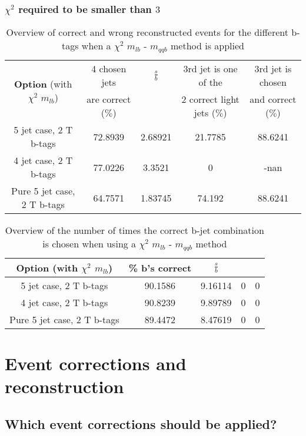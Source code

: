 \documentclass[a4paper,12pt]{report}
\begin{document}
 \subsection{$\chi^{2}$ required to be smaller than $3$}
 \begin{table}[!h] 
 \begin{tabular}{c|c|c|c|c} 
\multirow{2}{*}{\textbf{Option} (with $\chi^{2}$ $m_{lb}$)} & 4 chosen jets & $\frac{s}{b}$ & 3rd jet is one of the & 3rd jet is chosen \\ & are correct ($\%$)    & 	             & 2 correct light jets ($\%$) &  and correct ($\%$)	  \\ \hline 
 5 jet case,      2 T b-tags              & 72.8939 & 2.68921 & 21.7785 & 88.6241 \\ 
 4 jet case,      2 T b-tags              & 77.0226 & 3.3521 & 0 & -nan \\ 
 Pure 5 jet case, 2 T b-tags              & 64.7571 & 1.83745 & 74.192 & 88.6241 \\ 
 \end{tabular} 
 \caption{Overview of correct and wrong reconstructed events for the different b-tags when a $\chi^{2}$ $m_{lb}$ - $m_{qqb}$ method is applied} 
 \end{table} 
 
 \begin{table}[!h] 
 \begin{tabular}{c|c|c|c|c} 
 \textbf{Option} (with $\chi^{2}$ $m_{lb}$) & \% b's correct   & $\frac{s}{b}$ &  &  \\ \hline 
 5 jet case,      2 T b-tags              & 90.1586 & 9.16114 & 0 & 0 \\ 
 4 jet case,      2 T b-tags              & 90.8239 & 9.89789 & 0 & 0 \\ 
 Pure 5 jet case, 2 T b-tags              & 89.4472 & 8.47619 & 0 & 0 \\ 
 \end{tabular} 
 \caption{Overview of the number of times the correct b-jet combination is chosen when using a $\chi^{2}$ $m_{lb}$ - $m_{qqb}$ method} 
 \end{table} 
 
\chapter{Event corrections and reconstruction}

\section{Which event corrections should be applied?}
\end{document}
